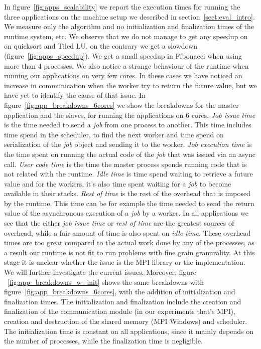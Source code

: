 	In figure~\ref{fig:apps_scalability} we report the execution times for running the three applications on the
machine setup we described in section~\ref{sect:eval_intro}.  We measure only the algorithm and no initialization
and finalization times of the runtime system, etc.
We observe that we do not manage to get any speedup on 
on quicksort and Tiled LU, on the contrary we get a slowdown (figure~\ref{fig:apps_speedup}).
We get a small speedup in Fibonacci when using more than 4 processes.  We also notice a strange
behaviour of the runtime when running our applications on very few cores. In these cases we have
noticed an increase in communication when the worker try to return the future value, but we have 
yet to identify the cause of that issue.
In figure~\ref{fig:app_breakdowns_6cores} 
we show the breakdowns for the master application and the slaves, for running the applications on 6 cores.
\emph{Job issue time} is the time needed to send a \emph{job} from one process to another. This time includes
time spend in the scheduler, to find the next worker and time spend on serialization of the \emph{job} object
and sending it to the worker.  \emph{Job execution time} is the time spent on running the actual code of the
\emph{job} that was issued via an async call.  \emph{User code time} is the time the master process spends
running code that is not related with the runtime.  \emph{Idle time} is time spend waiting to retrieve a future 
value and for the workers, it's also time spent waiting for a \emph{job} to become available in their stacks.
\emph{Rest of time} is the rest of the overhead that is imposed by the runtime.  This time can be for example 
the time needed to send the return value of the asynchronous execution of a \emph{job} by a worker.  In all 
applications we see that the either \emph{job issue time} or \emph{rest of time} are the greatest sources of 
overhead, while a fair amount of time is also spent on \emph{idle time}.  These overhead times are too great
compared to the actual work done by any of the processes, as a result our runtime is not fit to run 
problems with fine grain granurality.  At this stage it is unclear whether the issue
is the MPI library or the implementation.  We will further investigate the current issues.  Moreover, figure
~\ref{fig:app_breakdowns_w_init} shows the same breakdowns with figure~\ref{fig:app_breakdowns_6cores}, with 
the addition of initialization and finalization times.  The initialization and finalization include the 
creation and finalization of the communication module (in our experiments that's MPI), creation and destruction
of the shared memory (MPI Windows) and scheduler.  The initialization time is constant on all applications, since
it mainly depends on the number of processes, while the finalization time is negligible. 

